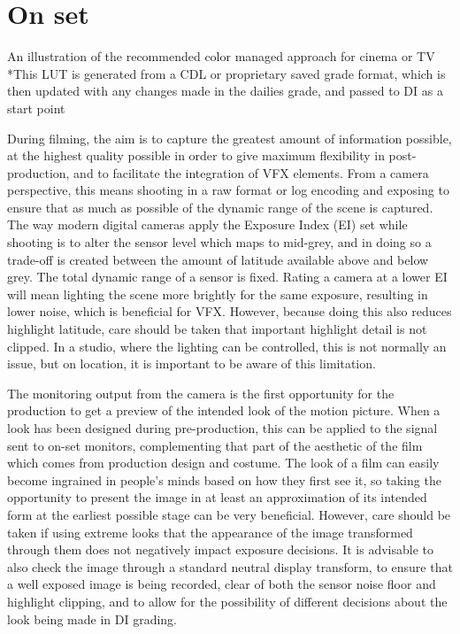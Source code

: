 \section{On set}

An illustration of the recommended color managed approach for cinema or TV
*This LUT is generated from a CDL or proprietary saved grade format, which is then updated with any changes made in the dailies grade, and passed to DI as a start point


During filming, the aim is to capture the greatest amount of information possible, at the highest quality possible in order to give maximum flexibility in post-production, and to facilitate the integration of VFX elements. From a camera perspective, this means shooting in a raw format or log encoding and exposing to ensure that as much as possible of the dynamic range of the scene is captured. The way modern digital cameras apply the Exposure Index (EI) set while shooting is to alter the sensor level which maps to mid-grey, and in doing so a trade-off is created between the amount of latitude available above and below grey. The total dynamic range of a sensor is fixed. Rating a camera at a lower EI will mean lighting the scene more brightly for the same exposure, resulting in lower noise, which is beneficial for VFX. However, because doing this also reduces highlight latitude, care should be taken that important highlight detail is not clipped. In a studio, where the lighting can be controlled, this is not normally an issue, but on location, it is important to be aware of this limitation.

The monitoring output from the camera is the first opportunity for the production to get a preview of the intended look of the motion picture. When a look has been designed during pre-production, this can be applied to the signal sent to on-set monitors, complementing that part of the aesthetic of the film which comes from production design and costume. The look of a film can easily become ingrained in people’s minds based on how they first see it, so taking the opportunity to present the image in at least an approximation of its intended form at the earliest possible stage can be very beneficial. However, care should be taken if using extreme looks that the appearance of the image transformed through them does not negatively impact exposure decisions. It is advisable to also check the image through a standard neutral display transform, to ensure that a well exposed image is being recorded, clear of both the sensor noise floor and highlight clipping, and to allow for the possibility of different decisions about the look being made in DI grading.



